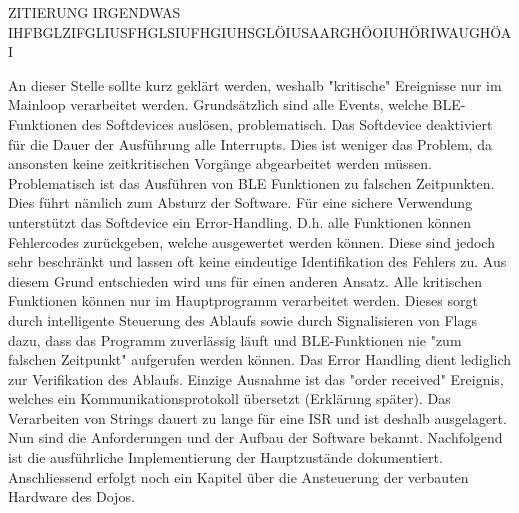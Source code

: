 ZITIERUNG IRGENDWAS IHFBGLZIFGLIUSFHGLSIUFHGIUHSGLÖIUSAARGHÖOIUHÖRIWAUGHÖAI




An dieser Stelle sollte kurz geklärt werden, weshalb "kritische" Ereignisse nur im Mainloop verarbeitet werden.
Grundsätzlich sind alle Events, welche BLE-Funktionen des Softdevices auslösen, problematisch. Das Softdevice deaktiviert für die Dauer der Ausführung alle Interrupts. Dies ist weniger das Problem, da ansonsten keine zeitkritischen Vorgänge abgearbeitet werden müssen. Problematisch ist das Ausführen von BLE Funktionen zu falschen Zeitpunkten. Dies führt nämlich zum Absturz der Software. Für eine sichere Verwendung unterstützt das Softdevice ein Error-Handling. D.h. alle Funktionen können Fehlercodes zurückgeben, welche ausgewertet werden können. Diese sind jedoch sehr beschränkt und lassen oft keine eindeutige Identifikation des Fehlers zu. Aus diesem Grund entschieden wird uns für einen anderen Ansatz. Alle kritischen Funktionen können nur im Hauptprogramm verarbeitet werden. Dieses sorgt durch intelligente Steuerung des Ablaufs sowie durch Signalisieren von Flags dazu, dass das Programm zuverlässig läuft und BLE-Funktionen nie "zum falschen Zeitpunkt" aufgerufen werden können. Das Error Handling dient lediglich zur Verifikation des Ablaufs.
Einzige Ausnahme ist das "order received" Ereignis, welches ein Kommunikationsprotokoll übersetzt (Erklärung später). Das Verarbeiten von Strings dauert zu lange für eine ISR und ist deshalb ausgelagert.
Nun sind die Anforderungen und der Aufbau der Software bekannt. Nachfolgend ist die ausführliche Implementierung der Hauptzustände dokumentiert. Anschliessend erfolgt noch ein Kapitel über die Ansteuerung der verbauten Hardware des Dojos.


